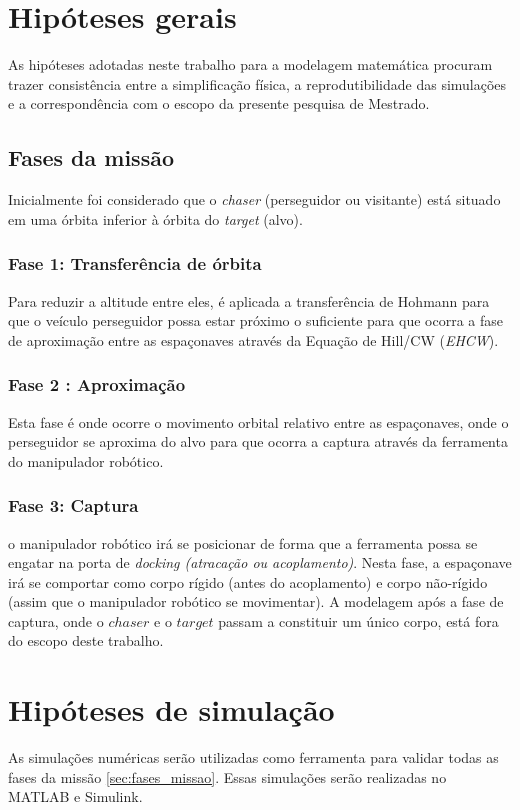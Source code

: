 \section{Hipóteses gerais}
As hipóteses adotadas neste trabalho para a modelagem matemática procuram trazer consistência entre a simplificação física, a reprodutibilidade das simulações e a correspondência com o escopo da presente pesquisa de Mestrado.

\subsection{Fases da missão}
\label{sec:fases_missao}
Inicialmente foi considerado que o \emph{chaser} (perseguidor ou visitante) está situado em uma órbita inferior à órbita do \emph{target} (alvo).

\subsubsection{Fase 1: Transferência de órbita}
Para reduzir a altitude entre eles, é aplicada a transferência de Hohmann para que o veículo perseguidor possa estar próximo o suficiente para que ocorra a fase de aproximação entre as espaçonaves através da Equação de Hill/CW (\emph{EHCW}).

\subsubsection{Fase 2 : Aproximação}
Esta fase é onde ocorre o movimento orbital relativo entre as espaçonaves, onde o perseguidor se aproxima do alvo para que ocorra a captura através da ferramenta do manipulador robótico.

\subsubsection{Fase 3: Captura}
o manipulador robótico irá se posicionar de forma que a ferramenta possa se engatar na porta de \emph{docking (atracação ou acoplamento)}.
Nesta fase, a espaçonave irá se comportar como corpo rígido (antes do acoplamento) e corpo não-rígido (assim que o manipulador robótico se movimentar).
A modelagem após a fase de captura, onde o $chaser$ e o $target$ passam a constituir um único corpo, está fora do escopo deste trabalho.

\section{Hipóteses de simulação}
As simulações numéricas serão utilizadas como ferramenta para validar todas as fases da missão \eqref{sec:fases_missao}.
Essas simulações serão realizadas no MATLAB e Simulink.

